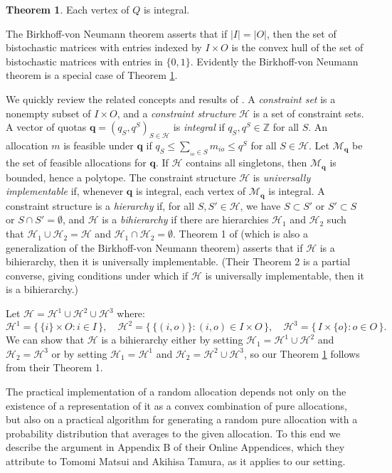 \documentclass[12pt]{article}
\theoremstyle{definition}
\newtheorem{thm}{Theorem}
\newcommand{\In}{\mathbb{Z}}
\newcommand{\bq}{\mathbf{q}}
\newcommand{\cH}{\mathcal{H}}
\newcommand{\cM}{\mathcal{M}}
\begin{document}
\begin{thm} \label{th:Implementability}
  Each vertex of $Q$ is integral.
\end{thm}

The Birkhoff-von Neumann theorem asserts that if $|I| = |O|$, then the set of bistochastic matrices with entries indexed by $I \times O$ is the convex hull of the set of bistochastic matrices with entries in $\{0,1\}$.   Evidently the Birkhoff-von Neumann theorem is a special case of Theorem \ref{th:Implementability}. 

We quickly review the related concepts and results of \cite{bckm13aer}.   A \emph{constraint set} is a nonempty subset of $I \times O$, and a \emph{constraint structure} $\cH$ is a set of constraint sets.  A vector of quotas $\bq = (q_S,q^S)_{S \in \cH}$ is \emph{integral} if $q_S,q^S \in \In$ for all $S$.
An allocation $m$ is feasible under $\bq$ if $q_S \le \sum_{_{io} \in S} m_{io} \le q^S$ for all $S \in \cH$.  Let $\cM_\bq$ be the set of feasible allocations for $\bq$. If $\cH$ contains all singletons, then $\cM_\bq$ is bounded, hence a polytope. The constraint structure $\cH$ is \emph{universally implementable} if, whenever $\bq$ is integral, each vertex of $\cM_\bq$ is integral.  A constraint structure is a \emph{hierarchy} if, for all $S, S' \in \cH$, we have $S \subset S'$ or $S' \subset S$ or $S \cap S' = \emptyset$, and $\cH$ is a \emph{bihierarchy} if there are hierarchies $\cH_1$ and $\cH_2$ such that $\cH_1 \cup \cH_2 = \cH$ and $\cH_1 \cap \cH_2 = \emptyset$.  Theorem 1 of \cite{bckm13aer} (which is also a generalization of the Birkhoff-von Neumann theorem) asserts that if $\cH$ is a bihierarchy, then it is universally implementable.  (Their Theorem 2 is a partial converse, giving conditions under which if $\cH$ is universally implementable, then it is a bihierarchy.)

Let $\cH = \cH^1 \cup \cH^2 \cup \cH^3$ where: 
$$\cH^1 = \{\, \{i\} \times O : i \in I \,\}, \quad \cH^2 = \{\, \{(i,o)\} : (i,o) \in I \times O \,\}, \quad \cH^3 = \{\, I \times \{o\} : o \in O \,\}.$$
We can show that $\cH$ is a bihierarchy either by setting $\cH_1 = \cH^1 \cup \cH^2$ and $\cH_2 = \cH^3$ or by setting $\cH_1 = \cH^1$ and $\cH_2 = \cH^2 \cup \cH^3$, so our Theorem \ref{th:Implementability} follows from their Theorem 1.   

The practical implementation of a random allocation depends not only on the existence of a representation of it as a convex combination of pure allocations, but also on a practical algorithm for generating a random pure allocation with a probability distribution that averages to the given allocation.  To this end we describe the argument in  Appendix B of their Online Appendices, which they attribute to Tomomi Matsui and Akihisa Tamura, as it applies to our setting.
\end{document}
